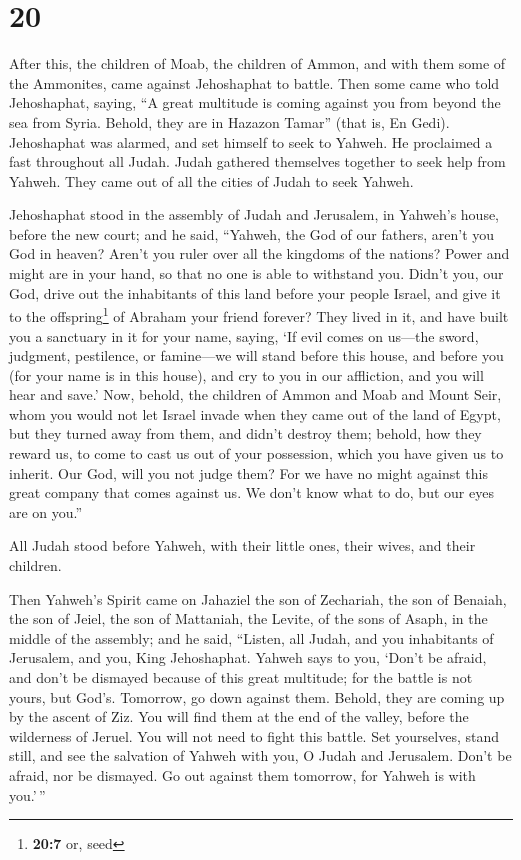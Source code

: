 \hypertarget{section-19}{%
\section{20}\label{section-19}}

 After this, the children of Moab, the children of Ammon,
and with them some of the Ammonites, came against Jehoshaphat to battle.
 Then some came who told Jehoshaphat, saying, ``A great
multitude is coming against you from beyond the sea from Syria. Behold,
they are in Hazazon Tamar'' (that is, En Gedi). 
Jehoshaphat was alarmed, and set himself to seek to Yahweh. He
proclaimed a fast throughout all Judah.  Judah gathered
themselves together to seek help from Yahweh. They came out of all the
cities of Judah to seek Yahweh.

 Jehoshaphat stood in the assembly of Judah and Jerusalem,
in Yahweh's house, before the new court;  and he said,
``Yahweh, the God of our fathers, aren't you God in heaven? Aren't you
ruler over all the kingdoms of the nations? Power and might are in your
hand, so that no one is able to withstand you.  Didn't
you, our God, drive out the inhabitants of this land before your people
Israel, and give it to the offspring\footnote{\textbf{20:7} or, seed} of
Abraham your friend forever?  They lived in it, and have
built you a sanctuary in it for your name, saying,  `If
evil comes on us---the sword, judgment, pestilence, or famine---we will
stand before this house, and before you (for your name is in this
house), and cry to you in our affliction, and you will hear and save.'
 Now, behold, the children of Ammon and Moab and Mount
Seir, whom you would not let Israel invade when they came out of the
land of Egypt, but they turned away from them, and didn't destroy them;
 behold, how they reward us, to come to cast us out of
your possession, which you have given us to inherit.  Our
God, will you not judge them? For we have no might against this great
company that comes against us. We don't know what to do, but our eyes
are on you.''

 All Judah stood before Yahweh, with their little ones,
their wives, and their children.

 Then Yahweh's Spirit came on Jahaziel the son of
Zechariah, the son of Benaiah, the son of Jeiel, the son of Mattaniah,
the Levite, of the sons of Asaph, in the middle of the assembly;
 and he said, ``Listen, all Judah, and you inhabitants of
Jerusalem, and you, King Jehoshaphat. Yahweh says to you, `Don't be
afraid, and don't be dismayed because of this great multitude; for the
battle is not yours, but God's.  Tomorrow, go down
against them. Behold, they are coming up by the ascent of Ziz. You will
find them at the end of the valley, before the wilderness of Jeruel.
 You will not need to fight this battle. Set yourselves,
stand still, and see the salvation of Yahweh with you, O Judah and
Jerusalem. Don't be afraid, nor be dismayed. Go out against them
tomorrow, for Yahweh is with you.'\,''

